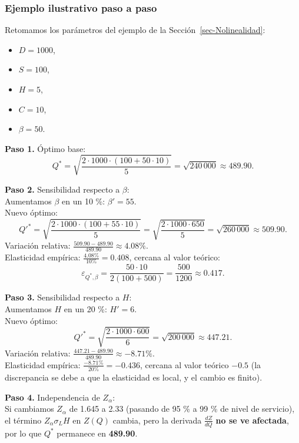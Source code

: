 \documentclass[
  spanish,
  us-letterpaper,
]{scrreprt}
\providecommand{\tightlist}{%
  \setlength{\itemsep}{0pt}\setlength{\parskip}{0pt}}
\numberwithin{equation}{section}
\begin{document}
\subsubsection{Ejemplo ilustrativo paso a
paso}\label{ejemplo-ilustrativo-paso-a-paso}

Retomamos los parámetros del ejemplo de la
Sección~\ref{sec-Nolinealidad}:

\begin{itemize}
\tightlist
\item
  \(D = 1000\),
\item
  \(S = 100\),
\item
  \(H = 5\),
\item
  \(C = 10\),
\item
  \(\beta = 50\).
\end{itemize}

\textbf{Paso 1.} Óptimo base: \[
Q^* = \sqrt{\frac{2 \cdot 1000 \cdot (100 + 50 \cdot 10)}{5}} = \sqrt{240\,000} \approx 489.90.
\]

\textbf{Paso 2.} Sensibilidad respecto a \(\beta\):\\
Aumentamos \(\beta\) en un 10 \%: \(\beta' = 55\).\\
Nuevo óptimo: \[
Q'^* = \sqrt{\frac{2 \cdot 1000 \cdot (100 + 55 \cdot 10)}{5}} = \sqrt{\frac{2 \cdot 1000 \cdot 650}{5}} = \sqrt{260\,000} \approx 509.90.
\] Variación relativa:
\(\frac{509.90 - 489.90}{489.90} \approx 4.08\%\).\\
Elasticidad empírica: \(\frac{4.08\%}{10\%} = 0.408\), cercana al valor
teórico: \[
\varepsilon_{Q^*, \beta} = \frac{50 \cdot 10}{2(100 + 500)} = \frac{500}{1200} \approx 0.417.
\]

\textbf{Paso 3.} Sensibilidad respecto a \(H\):\\
Aumentamos \(H\) en un 20 \%: \(H' = 6\).\\
Nuevo óptimo: \[
Q'^* = \sqrt{\frac{2 \cdot 1000 \cdot 600}{6}} = \sqrt{200\,000} \approx 447.21.
\] Variación relativa:
\(\frac{447.21 - 489.90}{489.90} \approx -8.71\%\).\\
Elasticidad empírica: \(\frac{-8.71\%}{20\%} = -0.436\), cercana al
valor teórico \(-0.5\) (la discrepancia se debe a que la elasticidad es
local, y el cambio es finito).

\textbf{Paso 4.} Independencia de \(Z_\alpha\):\\
Si cambiamos \(Z_\alpha\) de 1.645 a 2.33 (pasando de 95 \% a 99 \% de
nivel de servicio), el término \(Z_\alpha \sigma_L H\) en \(Z(Q)\)
cambia, pero la derivada \(\frac{dZ}{dQ}\) \textbf{no se ve afectada},
por lo que \(Q^*\) permanece en \textbf{489.90}.
\end{document}
